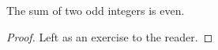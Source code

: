 \guard




\begin{prop}
\label{prop:sumOfOddIsEven}
  The sum of two odd integers is even.
\end{prop}
\begin{proof}
  Left as an exercise to the reader.
\end{proof}
